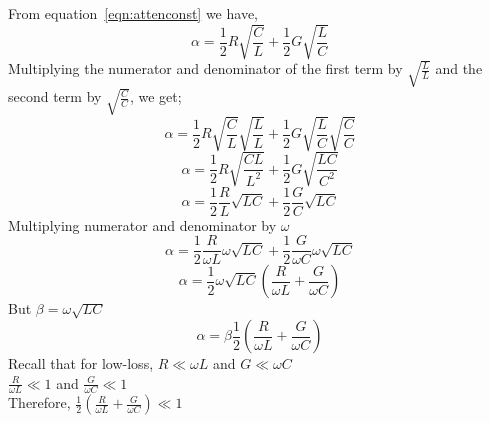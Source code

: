 From equation~\ref{eqn:attenconst} we have,
\begin{equation*}
\alpha =\frac{1}{2}R\sqrt{\frac{C}{L}} + \frac{1}{2}G\sqrt{\frac{L}{C}}	
\end{equation*}
Multiplying the numerator and denominator of the first term by $\sqrt{\frac{L}{L}}$ and the second term by $\sqrt{\frac{C}{C}}$, we get;
\begin{equation*}
\alpha = \frac{1}{2} R \sqrt{\frac{C}{L}} \sqrt{\frac{L}{L}} + \frac{1}{2} G \sqrt{\frac{L}{C}} \sqrt{\frac{C}{C}} 
\end{equation*}
\begin{equation*}
\alpha =  \frac{1}{2} R \sqrt{\frac{CL}{L^2}} + \frac{1}{2} G \sqrt{\frac{LC}{C^2}}	
\end{equation*}
\begin{equation*}
\alpha = \frac{1}{2} \frac{R}{L} \sqrt{LC} + \frac{1}{2} \frac{G}{C} \sqrt{LC}
\end{equation*}
Multiplying numerator and denominator by $\omega$\\
\begin{equation*}
\alpha = \frac{1}{2} \frac{R}{\omega L} \omega \sqrt{LC} + \frac{1}{2} \frac{G}{\omega C} \omega \sqrt{LC}
\end{equation*}
\begin{equation*}
\alpha = \frac{1}{2} \omega\sqrt{LC}\left(\frac{R}{\omega L} + \frac{G}{\omega C}\right)
\end{equation*}
But $\beta = \omega \sqrt{LC}$
\begin{equation}
\alpha = \beta\frac{1}{2} \left(\frac{R}{\omega L} + \frac{G}{\omega C}\right)
\end{equation}
Recall that for low-loss, $R \ll \omega L$ and $G \ll \omega C$\\
$\frac{R}{\omega L} \ll 1$ and $\frac{G}{\omega C} \ll 1$\\
Therefore,  $\frac{1}{2} (\frac{R}{\omega L} + \frac{G}{\omega C}) \ll 1$\\

